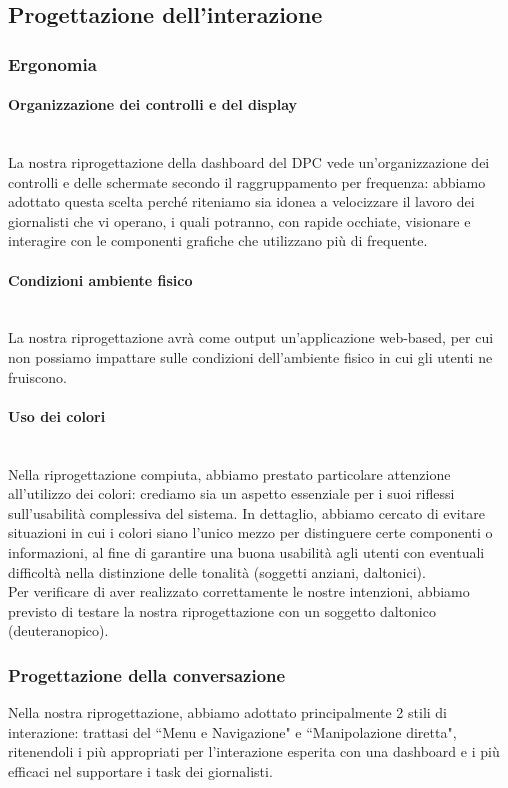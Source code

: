 \subsection{Progettazione dell'interazione}

\subsubsection{Ergonomia}

\paragraph{Organizzazione dei controlli e del display}\mbox{}\\
La nostra riprogettazione della dashboard del DPC vede un'organizzazione dei controlli e delle schermate secondo il raggruppamento per frequenza: abbiamo adottato questa scelta perché riteniamo sia idonea a velocizzare il lavoro dei giornalisti che vi operano, i quali potranno, con rapide occhiate, visionare e interagire con le componenti grafiche che utilizzano più di frequente.

\paragraph{Condizioni ambiente fisico}\mbox{}\\
La nostra riprogettazione avrà come output un'applicazione web-based, per cui non possiamo impattare sulle condizioni dell'ambiente fisico in cui gli utenti ne fruiscono.

\paragraph{Uso dei colori}\mbox{}\\
Nella riprogettazione compiuta, abbiamo prestato particolare attenzione all'utilizzo dei colori: crediamo sia un aspetto essenziale per i suoi riflessi sull'usabilità complessiva del sistema. In dettaglio, abbiamo cercato di evitare situazioni in cui i colori siano l'unico mezzo per distinguere certe componenti o informazioni, al fine di garantire una buona usabilità agli utenti con eventuali difficoltà nella distinzione delle tonalità (soggetti anziani, daltonici).\\
Per verificare di aver realizzato correttamente le nostre intenzioni, abbiamo previsto di testare la nostra riprogettazione con un soggetto daltonico (deuteranopico).  

\subsubsection{Progettazione della conversazione}
Nella nostra riprogettazione, abbiamo adottato principalmente 2 stili di interazione: trattasi del ``Menu e Navigazione" e ``Manipolazione diretta", ritenendoli i più appropriati per l'interazione esperita con una dashboard e i più efficaci nel supportare i task dei giornalisti.

